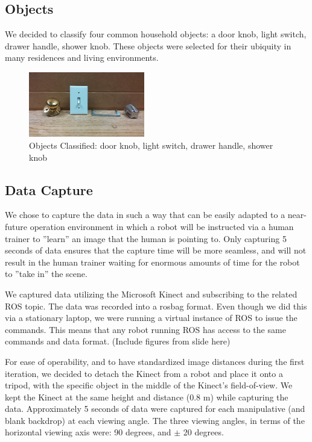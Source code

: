 \documentclass{article}
\begin{document}
\subsection{Objects}
We decided to classify four common household objects: a door knob, light switch, drawer handle, shower knob. These objects were selected
for their ubiquity in many residences and living environments. 

\begin{figure}[h!]
    \centering
    \includegraphics[width=0.45\textwidth]{All_Knobs.jpg}
    \caption{Objects Classified: door knob, light switch, drawer handle, shower knob}
    \label{fig:objects}
\end{figure}

\subsection{Data Capture}
We chose to capture the data in such a way that can be easily adapted to a near-future operation environment in which a robot will be instructed via a human trainer to ''learn'' an image that the human is pointing to.  Only capturing 5 seconds of data ensures that the capture time will be more seamless, and will not result in the human trainer waiting for enormous amounts of time for the robot to ''take in'' the scene.  

We captured data utilizing the Microsoft Kinect and subscribing to the related ROS topic.  The data was recorded into a rosbag format.  Even though we did this via a stationary laptop, we were running a virtual instance of ROS to issue the commands. This means that any robot running ROS has access to the same commands and data format. (Include figures from slide here)

For ease of operability, and to have standardized image distances during the first iteration, we decided to detach the Kinect from a robot and place it onto a tripod, with the specific object in the middle of the Kinect's field-of-view. We kept the Kinect at the same height and distance (0.8 m) while capturing the data. Approximately 5 seconds of data were captured for each manipulative (and blank backdrop) at each viewing angle. The three viewing angles, in terms of the horizontal viewing axis were: 90 degrees, and \(\pm\) 20 degrees.
\end{document}
